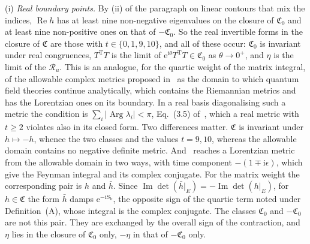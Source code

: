 (i) \emph{Real boundary points.} By (ii) of the paragraph on linear contours that mix the indices, \(\operatorname{Re}h\) has at least nine non-negative eigenvalues on the closure of \(\mathfrak C_0\) and at least nine non-positive ones on that of \(-\mathfrak C_0\). So the real invertible forms in the closure of \(\mathfrak C\) are those with \(t\in\{0,1,9,10\}\), and all of these occur: \(\mathfrak C_0\) is invariant under real congruences, \(T^{\mathrm T}T\) is the limit of \(\mathrm e^{\mathrm i\theta}T^{\mathrm T}T\in\mathfrak C_0\) as \(\theta\to0^+\), and \(\eta\) is the limit of the \(\mathcal R_u\). This is an analogue, for the quartic weight of the matrix integral, of the allowable complex metrics proposed in~\cite{KontsevichSegal2021} as the domain to which quantum field theories continue analytically, which contains the Riemannian metrics and has the Lorentzian ones on its boundary. In a real basis diagonalising such a metric the condition is \(\sum_i|\operatorname{Arg}\lambda_i|<\pi\), Eq.~(3.5) of~\cite{Witten2021ComplexMetrics}, which a real metric with \(t\ge2\) violates also in its closed form. Two differences matter. \(\mathfrak C\) is invariant under \(h\mapsto-h\), whence the two classes and the values \(t=9,10\), whereas the allowable domain contains no negative definite metric. And~\cite{Witten2021ComplexMetrics} reaches a Lorentzian metric from the allowable domain in two ways, with time component \(-(1\mp\mathrm i\epsilon)\), which give the Feynman integral and its complex conjugate. For the matrix weight the corresponding pair is \(h\) and \(\bar h\). Since \(\operatorname{Im}\det(\bar h|_E)=-\operatorname{Im}\det(h|_E)\), for \(h\in\mathfrak C\) the form \(\bar h\) damps \(\mathrm e^{-\mathrm iS_{\mathrm b}}\), the opposite sign of the quartic term noted under Definition~(A), whose integral is the complex conjugate. The classes \(\mathfrak C_0\) and \(-\mathfrak C_0\) are not this pair. They are exchanged by the overall sign of the contraction, and \(\eta\) lies in the closure of \(\mathfrak C_0\) only, \(-\eta\) in that of \(-\mathfrak C_0\) only.

